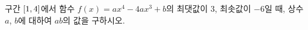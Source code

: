 구간 $[1{,}\mkern3mu\mathopen{}4]$에서 함수 $f(x)=ax^4-4ax^3+b$의 최댓값이 $3$, 최솟값이 $-6$일 때, 상수 $a$, $b$에 대하여 $ab$의 값을 구하시오. 
